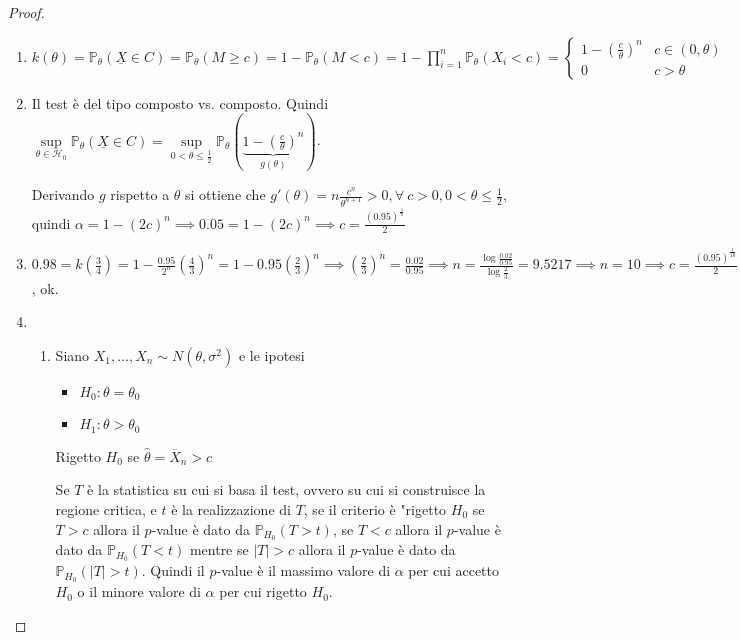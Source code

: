 \documentclass[hidelinks, 10pt]{report}
\begin{document}
\begin{proof}
\noindent
\begin{enumerate}
\item $ k(\theta) = \mathbb{P}_{\theta} (\underline{X} \in C) = \mathbb{P}_{\theta} (M \ge c) = 1 - \mathbb{P}_{\theta} (M < c) = 1 - \prod\limits_{i = 1}^{n} \mathbb{P}_{\theta} (X_{i} < c) = \begin{cases} 1 - \left( \frac{c}{\theta} \right)^{n} & c \in (0, \theta) \\ 0 & c > \theta \end{cases} $
\item Il test \`e del tipo composto vs. composto. Quindi $ \sup\limits_{\theta \in \mathcal{H}_{0}} \mathbb{P}_{\theta} (\underline{X} \in C) = \sup\limits_{0 < \theta \le \frac{1}{2}} \mathbb{P}_{\theta} \left( \underbrace{1 - \left( \frac{c}{\theta} \right)^{n}}_{g(\theta)} \right) $.

Derivando $ g $ rispetto a $ \theta $ si ottiene  che $ g'(\theta) = n \frac{c^{n}}{\theta^{n + 1}} > 0, \forall\ c > 0, 0 < \theta \le \frac{1}{2} $, quindi $ \alpha = 1 - (2c)^{n} \implies 0.05 = 1 - (2c)^{n} \implies c = \frac{(0.95)^{\frac{1}{n}}}{2} $
\item $ 0.98 = k \left( \frac{3}{4} \right) = 1 - \frac{0.95}{2^{n}} \left( \frac{4}{3} \right)^{n} = 1 - 0.95 \left( \frac{2}{3} \right)^{n} \implies \left( \frac{2}{3} \right)^{n} = \frac{0.02}{0.95} \implies n = \frac{\log \frac{0.02}{0.95}}{\log \frac{2}{3}} = 9.5217 \implies n = 10 \implies c = \frac{(0.95)^{\frac{1}{10}}}{2} = 0.497 < \frac{3}{4} $, ok.
\item \noindent
\begin{enumerate}
\item Siano $ X_{1}, \dotsc, X_{n} \sim N(\theta, \sigma^{2}) $ e le ipotesi
\begin{itemize}
\item $ H_{0}: \theta = \theta_{0} $
\item $ H_{1}: \theta > \theta_{0} $
\end{itemize}

Rigetto $ H_{0} $ se $ \hat{\theta} = \overline{X}_{n} > c $


Se $ T $ \`e la statistica su cui si basa il test, ovvero su cui si construisce la regione critica, e $ t $ \`e la realizzazione di $ T $, se il criterio \`e "rigetto $ H_{0} $ se $ T > c $ allora il $ p $-value \`e dato da $ \mathbb{P}_{H_{0}} (T > t) $, se $ T < c $ allora il $ p $-value \`e dato da $ \mathbb{P}_{H_{0}} (T < t) $ mentre se $ \vert T \vert > c $ allora il $ p $-value \`e dato da $ \mathbb{P}_{H_{0}} (\vert T \vert > t) $.
Quindi il $ p $-value \`e il massimo valore di $ \alpha $ per cui accetto $ H_{0} $ o il minore valore di $ \alpha $ per cui rigetto $ H_{0} $.


\end{enumerate}
\end{enumerate}
\end{proof}
\end{document}
